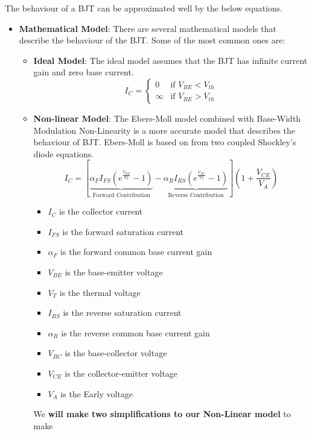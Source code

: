 The behaviour of a BJT can be approximated well by the below equations.
\begin{itemize}
  \item \textbf{Mathematical Model}:
    There are several mathematical models that describe the behaviour of the
    BJT. Some of the most common ones are:
    \begin{itemize}
      \item \textbf{Ideal Model}: The ideal model assumes that the BJT has infinite
        current gain and zero base current.
        \[
          I_C = \begin{cases}
            0 & \text{if } V_{BE} < V_{th} \\
            \infty & \text{if } V_{BE} > V_{th}
          \end{cases}
        \]
      \item \textbf{Non-linear Model}: The Ebers-Moll model combined with Base-Width Modulation
        Non-Linearity is a more accurate model that describes the behaviour of BJT. Ebers-Moll
        is based on from two coupled Shockley's diode equations.
        \[
          I_C = \left[\underbrace{\alpha_F I_{FS} \left( e^{\frac{V_{BE}}{V_T}} - 1 \right)}_{\text{Forward Contribution}} - \underbrace{\alpha_R I_{RS} \left( e^{\frac{V_{BC}}{V_T}} - 1 \right)}_{\text{Reverse Contribution}}\right] \left( 1 + \frac{V_{CE}}{V_A} \right)
        \]
        \begin{itemize}
          \item \(I_C\) is the collector current
          \item \(I_{FS}\) is the forward saturation current
          \item \(\alpha_F\) is the forward common base current gain
          \item \(V_{BE}\) is the base-emitter voltage
          \item \(V_T\) is the thermal voltage
          \item \(I_{RS}\) is the reverse saturation current
          \item \(\alpha_R\) is the reverse common base current gain
          \item \(V_{BC}\) is the base-collector voltage
          \item \(V_{CE}\) is the collector-emitter voltage
          \item \(V_A\) is the Early voltage
        \end{itemize}
        We \textbf{will make two simplifications to our Non-Linear model} to make

\end{itemize}
\end{itemize}
